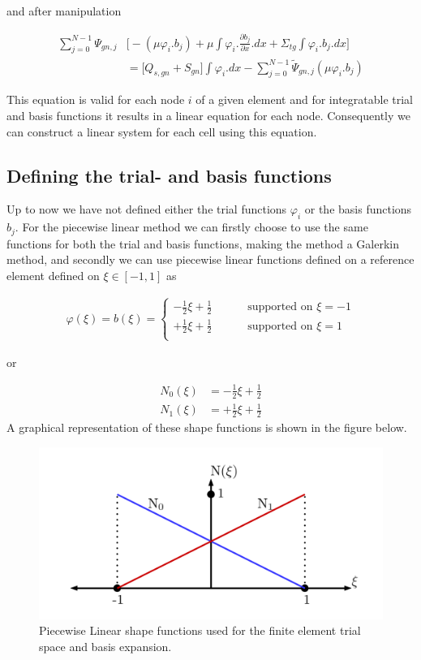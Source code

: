 \documentclass[11pt,letterpaper,titlepage]{article}
\numberwithin{equation}{section}
\newcommand{\beq}{\begin{equation*}
\begin{aligned}}
\newcommand{\eeq}{\end{aligned}
\end{equation*}}
\newcommand{\beqn}{\begin{equation}
	\begin{aligned}}
\newcommand{\eeqn}{\end{aligned}
	\end{equation}}
\begin{document}
and after manipulation

\beqn \label{eq:FEMnodei} 
\sum_{j=0}^{N-1} \Psi_{gn,j} &\biggr[
-(\mu \varphi_i.  b_j )
+\mu \int  \varphi_i.\frac{\partial b_j}{\partial x}.dx
+ \Sigma_{tg}\int \varphi_i. b_j.dx
\biggr]\\
&= \biggr[Q_{s,gn}
+  S_{gn} \biggr]\int \varphi_i .dx
- \sum_{j=0}^{N-1} \tilde{\Psi}_{gn,j} (\mu \varphi_i.  b_j )
\eeqn

This equation is valid for each node $i$ of a given element and for integratable trial and basis functions it results in a linear equation for each node. Consequently we can construct a linear system for each cell using this equation. 

\newpage
\subsection{Defining the trial- and basis functions}
Up to now we have not defined either the trial functions $\varphi_i$ or the basis functions $b_j$. For the piecewise linear method we can firstly choose to use the same functions for both the trial and basis functions, making the method a Galerkin method, and secondly we can use piecewise linear functions defined on a reference element defined on $\xi\in[-1,1]$ as

\beq
\varphi(\xi) = b(\xi) = 
\begin{cases}
-\frac{1}{2}\xi+\frac{1}{2}    \quad \quad &\text{ supported on } \xi=-1\\
+\frac{1}{2}\xi+\frac{1}{2}    \quad \quad &\text{ supported on } \xi=1\\
\end{cases}
\eeq 

or 

\beq
N_0(\xi) &= -\frac{1}{2}\xi+\frac{1}{2} \\
N_1(\xi) &= +\frac{1}{2}\xi+\frac{1}{2}
\eeq 
\newline
A graphical representation of these shape functions is shown in the figure below.
\begin{figure}[H]
\centering
\includegraphics[width=0.5\linewidth]{images/ShapeFunctions.png}
\caption{Piecewise Linear shape functions used for the finite element trial space and basis expansion.}
\label{fig:shapefunctions}
\end{figure}
\end{document}
